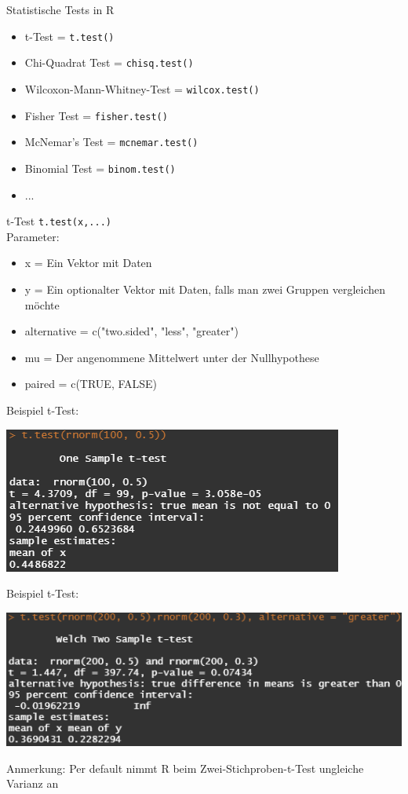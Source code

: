 \documentclass[xcolor=dvipsnames, aspectratio = 169]{beamer}
\begin{document}
\begin{frame}[fragile]{Statistische Tests in R}
	\begin{itemize}
		\item t-Test = \verb+t.test()+
		\item Chi-Quadrat Test = \verb+chisq.test()+
		\item Wilcoxon-Mann-Whitney-Test = \verb+wilcox.test()+
		\item Fisher Test = \verb+fisher.test()+
		\item McNemar's Test = \verb+mcnemar.test()+
		\item Binomial Test = \verb+binom.test()+
		\item ...
	\end{itemize}
\end{frame}


\begin{frame}[fragile]{t-Test}
\verb+t.test(x,...)+\\
Parameter:
	\begin{itemize}
		\item x = Ein Vektor mit Daten
		\item y = Ein optionalter Vektor mit Daten, falls man zwei Gruppen vergleichen möchte
		\item alternative = c("two.sided", "less", "greater")
		\item mu = Der angenommene Mittelwert unter der Nullhypothese
		\item paired = c(TRUE, FALSE)
	\end{itemize}
\end{frame}

\begin{frame}[fragile]{Beispiel t-Test:}	
	\begin{center}
		\includegraphics{OneSampleTtest}
	\end{center}
\end{frame}

\begin{frame}[fragile]{Beispiel t-Test:}	
	\begin{center}
		\includegraphics{TwoSampleTtest}
	\end{center}
Anmerkung: Per default nimmt R beim Zwei-Stichproben-t-Test ungleiche Varianz an
\end{frame}
\end{document}
